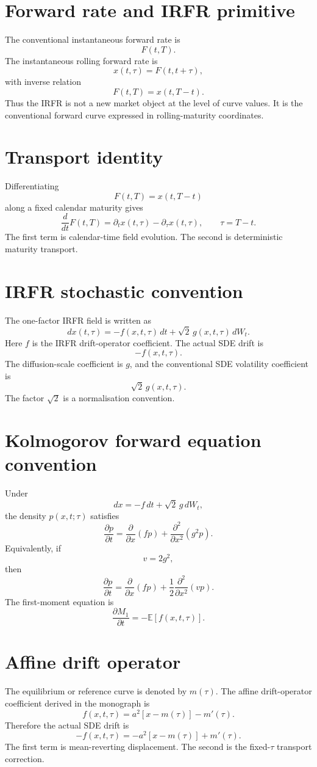 \documentclass[11pt,oneside]{book}
\begin{document}
\section{Forward rate and IRFR primitive}
The conventional instantaneous forward rate is
\[
F(t,T).
\]
The instantaneous rolling forward rate is
\[
x(t,\tau)=F(t,t+\tau),
\]
with inverse relation
\[
F(t,T)=x(t,T-t).
\]
Thus the IRFR is not a new market object at the level of curve values. It is the conventional forward curve expressed in rolling-maturity coordinates.

\section{Transport identity}
Differentiating
\[
F(t,T)=x(t,T-t)
\]
along a fixed calendar maturity gives
\[
\frac{d}{dt}F(t,T)
=
\partial_t x(t,\tau)-\partial_\tau x(t,\tau),
\qquad \tau=T-t.
\]
The first term is calendar-time field evolution. The second is deterministic maturity transport.

\section{IRFR stochastic convention}
The one-factor IRFR field is written as
\[
dx(t,\tau)
=
-f(x,t,\tau)\,dt
+
\sqrt{2}\,g(x,t,\tau)\,dW_t.
\]
Here \(f\) is the IRFR drift-operator coefficient. The actual SDE drift is
\[
-f(x,t,\tau).
\]
The diffusion-scale coefficient is \(g\), and the conventional SDE volatility coefficient is
\[
\sqrt{2}\,g(x,t,\tau).
\]
The factor \(\sqrt{2}\) is a normalisation convention.

\section{Kolmogorov forward equation convention}
Under
\[
dx=-f\,dt+\sqrt{2}\,g\,dW_t,
\]
the density \(p(x,t;\tau)\) satisfies
\[
\frac{\partial p}{\partial t}
=
\frac{\partial}{\partial x}(fp)
+
\frac{\partial^2}{\partial x^2}(g^2p).
\]
Equivalently, if
\[
v=2g^2,
\]
then
\[
\frac{\partial p}{\partial t}
=
\frac{\partial}{\partial x}(fp)
+
\frac{1}{2}\frac{\partial^2}{\partial x^2}(vp).
\]
The first-moment equation is
\[
\frac{\partial M_1}{\partial t}
=
-\mathbb{E}[f(x,t,\tau)].
\]

\section{Affine drift operator}
The equilibrium or reference curve is denoted by \(m(\tau)\). The affine drift-operator coefficient derived in the monograph is
\[
f(x,t,\tau)=a^2[x-m(\tau)]-m'(\tau).
\]
Therefore the actual SDE drift is
\[
-f(x,t,\tau)=-a^2[x-m(\tau)]+m'(\tau).
\]
The first term is mean-reverting displacement. The second is the fixed-\(\tau\) transport correction.
\end{document}
